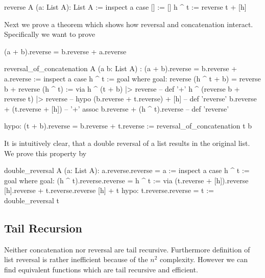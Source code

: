 \begin{alba}
  reverse A (a: List A): List A :=
    inspect a case
      [] :=
        []
      h ^ t :=
        reverse t + [h]
\end{alba}


Next we prove a theorem which shows how reversal and concatenation
interact. Specifically we want to prove
\begin{alba}
  (a + b).reverse = b.reverse + a.reverse
\end{alba}

\begin{alba}
  reversal_of_concatenation
    A
    (a b: List A)
    : (a + b).reverse = b.reverse + a.reverse :=
      inspect a case
        h ^ t :=
          goal where
             goal: reverse (h ^ t + b) = reverse b + reverse (h ^ t) :=
               via
                 h ^ (t + b) |> reverse                     -- def '+'
                 h ^ (reverse b + reverse t) |> reverse     -- hypo
                 (b.reverse + t.reverse) + [h]              -- def 'reverse'
                 b.reverse + (t.reverse + [h])              -- '+' assoc
                 b.reverse + (h ^ t).reverse                -- def 'reverse'

             hypo: (t + b).reverse = b.reverse + t.reverse :=
               reversal_of_concatenation t b
\end{alba}


It is intuitively clear, that a double reversal of a list results in the
original list. We prove this property by
%
\begin{alba}
  double_reversal A (a: List A): a.reverse.reverse = a :=
    inspect a case
      h ^ t :=
        goal where
          goal: (h ^ t).reverse.reverse = h ^ t :=
            via
              (t.reverse + [h]).reverse
              [h].reverse + t.reverse.reverse
              [h] + t
          hypo: t.reverse.reverse = t :=
            double_reversal t
\end{alba}



\subsection{Tail Recursion}

Neither concatenation nor reversal are tail recursive. Furthermore definition
of list reversal is rather inefficient because of the $n^2$
complexity. However we can find equivalent functions which are tail recursive
and efficient.

